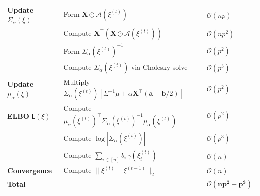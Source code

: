 \documentclass[12pt]{article}
\numberwithin{equation}{section}
\begin{document}
{\begin{table}[H]
\begin{tabular}{lll}
\midrule
\textbf{Update $\Sigma_{\alpha}(\xi)$} 
& Form $\mathbf{X} \odot \mathcal{A}(\xi^{(t)})$ & $\mathcal{O}(np)$ \\
& Compute $\mathbf{X}^\top (\mathbf{X} \odot \mathcal{A}(\xi^{(t)}))$ & $\mathcal{O}(np^2)$ \\
& Form $\Sigma_{\alpha}(\xi^{(t)})^{-1}$ & $\mathcal{O}(p^2)$ \\
& Compute $\Sigma_{\alpha}(\xi^{(t)})$ via Cholesky solve & $\mathcal{O}(p^3)$ \\

\midrule
\textbf{Update $\mu_{\alpha}(\xi)$} 
& Multiply $\Sigma_{\alpha}(\xi^{(t)})\left[\Sigma^{-1}\mu
+
\alpha\mathbf{X}^\top (\mathbf{a} - \mathbf{b}/2)\right]$ & $\mathcal{O}(p^2)$ \\

\midrule
\textbf{ELBO} $\mathsf{L}(\xi)$
& Compute $\mu_{\alpha}(\xi^{(t)})^\top \Sigma_{\alpha}(\xi^{(t)})^{-1} \mu_{\alpha}(\xi^{(t)})$ & $\mathcal{O}(p^2)$ \\
& Compute $\log |\Sigma_{\alpha}(\xi^{(t)})|$ & $\mathcal{O}(p^3)$ \\
& Compute $\sum_{i \in [n]} b_i\, \gamma(\xi_i^{(t)})$ & $\mathcal{O}(n)$ \\

\midrule
\textbf{Convergence} 
& Compute $\|\xi^{(t)} - \xi^{(t-1)}\|_2$ & $\mathcal{O}(n)$ \\

\midrule
\textbf{Total} & & $\mathbf{\mathcal{O}(np^2 + p^3)}$ \\
\bottomrule
\bottomrule
\end{tabular}
\end{table}
}

\newpage
\end{document}
